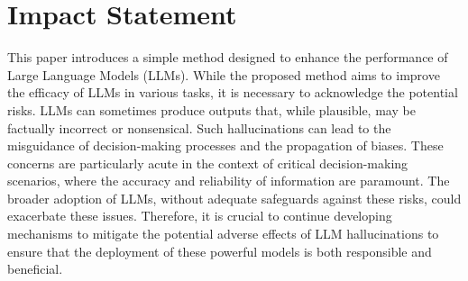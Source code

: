 \section*{Impact Statement}
This paper introduces a simple method designed to enhance the performance of Large Language Models (LLMs). While the proposed method aims to improve the efficacy of LLMs in various tasks, it is necessary to acknowledge the potential risks. LLMs can sometimes produce outputs that, while plausible, may be factually incorrect or nonsensical. Such hallucinations can lead to the misguidance of decision-making processes and the propagation of biases. These concerns are particularly acute in the context of critical decision-making scenarios, where the accuracy and reliability of information are paramount. The broader adoption of LLMs, without adequate safeguards against these risks, could exacerbate these issues. Therefore, it is crucial to continue developing mechanisms to mitigate the potential adverse effects of LLM hallucinations to ensure that the deployment of these powerful models is both responsible and beneficial.
